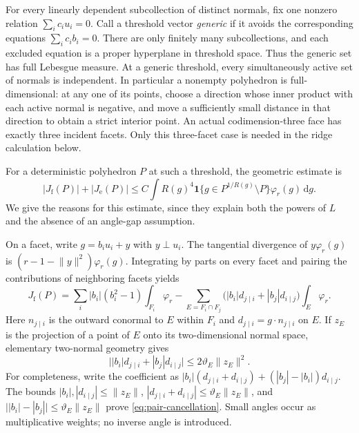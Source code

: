 \documentclass[11pt]{article}
\newcommand{\ind}{\mathbf 1}
\newcommand{\dd}{\,\mathrm d}
\newcommand{\norm}[1]{\lVert #1\rVert}
\newcommand{\Jf}{J_{\mathrm f}}
\newcommand{\Je}{J_{\mathrm e}}
\begin{document}
For every linearly dependent subcollection of distinct normals, fix
one nonzero relation $\sum_i c_i u_i=0$. Call a threshold vector
\emph{generic} if it avoids the corresponding equations
$\sum_i c_i b_i=0$. There are only finitely many subcollections, and
each excluded equation is a proper hyperplane in threshold space.
Thus the generic set has full Lebesgue measure. At a generic
threshold, every simultaneously active set of normals is independent.
In particular a nonempty polyhedron is full-dimensional: at any one
of its points, choose a direction whose inner product with each
active normal is negative, and move a sufficiently small distance in
that direction to obtain a strict interior point. An actual
codimension-three face has exactly three incident facets. Only this
three-facet case is needed in the ridge calculation below.

For a deterministic polyhedron $P$ at such a threshold, the geometric
estimate is
\begin{equation}\label{eq:localization}
 |\Jf(P)|+|\Je(P)|
 \le C\int R(g)^4
   \ind\{g\in P^{1/R(g)}\setminus P\}\varphi_r(g)\dd g.
\end{equation}
We give the reasons for this estimate, since they explain both the
powers of $L$ and the absence of an angle-gap assumption.

On a facet, write $g=b_iu_i+y$ with $y\perp u_i$. The tangential
divergence of $y\varphi_r(g)$ is
$(r-1-\norm y^2)\varphi_r(g)$. Integrating by parts on every facet and
pairing the contributions of neighboring facets yields
\begin{equation}\label{eq:facet-green}
 \Jf(P)=\sum_i|b_i|(b_i^2-1)\int_{F_i}\varphi_r
 -\sum_{E=F_i\cap F_j}
   \bigl(|b_i|d_{j\mid i}+|b_j|d_{i\mid j}\bigr)
       \int_E\varphi_r.
\end{equation}
Here $n_{j\mid i}$ is the outward conormal to $E$ within $F_i$ and
$d_{j\mid i}=g\cdot n_{j\mid i}$ on $E$. If $z_E$ is the projection
of a point of $E$ onto its two-dimensional normal space, elementary
two-normal geometry gives
\begin{equation}\label{eq:pair-cancellation}
 \bigl||b_i|d_{j\mid i}+|b_j|d_{i\mid j}\bigr|
 \le2\vartheta_E\norm{z_E}^2.
\end{equation}
For completeness, write the coefficient as
$|b_i|(d_{j\mid i}+d_{i\mid j})+(|b_j|-|b_i|)d_{i\mid j}$.
The bounds $|b_i|,|d_{i\mid j}|\le\norm{z_E}$,
$|d_{j\mid i}+d_{i\mid j}|\le\vartheta_E\norm{z_E}$, and
$\bigl||b_i|-|b_j|\bigr|\le\vartheta_E\norm{z_E}$ prove
\eqref{eq:pair-cancellation}. Small angles occur as multiplicative
weights; no inverse angle is introduced.
\end{document}
